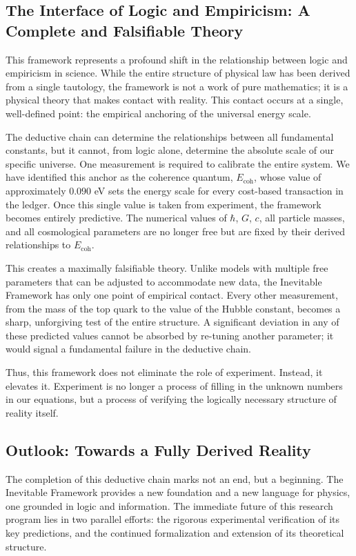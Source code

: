 \documentclass[11pt,a4paper]{article}
\begin{document}
\subsection{The Interface of Logic and Empiricism: A Complete and Falsifiable Theory}
This framework represents a profound shift in the relationship between logic and empiricism in science. While the entire structure of physical law has been derived from a single tautology, the framework is not a work of pure mathematics; it is a physical theory that makes contact with reality. This contact occurs at a single, well-defined point: the empirical anchoring of the universal energy scale.

The deductive chain can determine the relationships between all fundamental constants, but it cannot, from logic alone, determine the absolute scale of our specific universe. One measurement is required to calibrate the entire system. We have identified this anchor as the coherence quantum, \(E_{\text{coh}}\), whose value of approximately \(0.090\) eV sets the energy scale for every cost-based transaction in the ledger. Once this single value is taken from experiment, the framework becomes entirely predictive. The numerical values of \(\hbar\), \(G\), \(c\), all particle masses, and all cosmological parameters are no longer free but are fixed by their derived relationships to \(E_{\text{coh}}\).

This creates a maximally falsifiable theory. Unlike models with multiple free parameters that can be adjusted to accommodate new data, the Inevitable Framework has only one point of empirical contact. Every other measurement, from the mass of the top quark to the value of the Hubble constant, becomes a sharp, unforgiving test of the entire structure. A significant deviation in any of these predicted values cannot be absorbed by re-tuning another parameter; it would signal a fundamental failure in the deductive chain.

Thus, this framework does not eliminate the role of experiment. Instead, it elevates it. Experiment is no longer a process of filling in the unknown numbers in our equations, but a process of verifying the logically necessary structure of reality itself.

\subsection{Outlook: Towards a Fully Derived Reality}
The completion of this deductive chain marks not an end, but a beginning. The Inevitable Framework provides a new foundation and a new language for physics, one grounded in logic and information. The immediate future of this research program lies in two parallel efforts: the rigorous experimental verification of its key predictions, and the continued formalization and extension of its theoretical structure.
\end{document}
